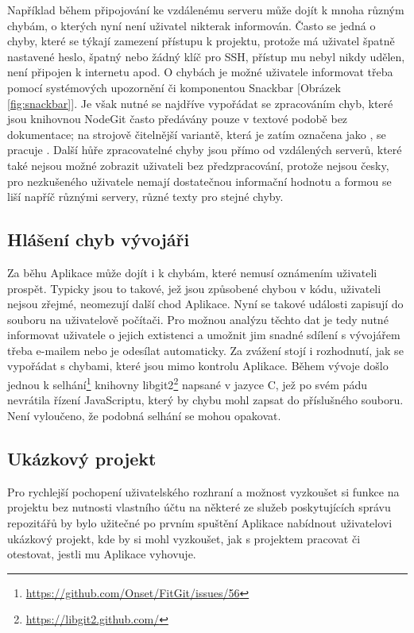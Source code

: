 Například během připojování ke vzdálenému serveru může dojít k mnoha různým chybám, o kterých nyní není uživatel nikterak informován. Často se jedná o chyby, které se týkají zamezení přístupu k projektu, protože má uživatel špatně nastavené heslo, špatný nebo žádný klíč pro SSH, přístup mu nebyl nikdy udělen, není připojen k internetu apod. O chybách je možné uživatele informovat třeba pomocí systémových upozornění či komponentou Snackbar [Obrázek \ref{fig:snackbar}]. Je však nutné se najdříve vypořádat se zpracováním chyb, které jsou knihovnou NodeGit často předávány pouze v textové podobě bez dokumentace; na strojově čitelnější variantě, která je zatím označena jako , se pracuje \cite{nodegit-error-codes}. Další hůře zpracovatelné chyby jsou přímo od vzdálených serverů, které také nejsou možné zobrazit uživateli bez předzpracování, protože nejsou česky, pro nezkušeného uživatele nemají dostatečnou informační hodnotu a formou se liší napříč různými servery, různé texty pro stejné chyby.

\subsection{Hlášení chyb vývojáři}

Za běhu Aplikace může dojít i k chybám, které nemusí oznámením uživateli prospět. Typicky jsou to takové, jež jsou způsobené chybou v kódu, uživateli nejsou zřejmé, neomezují další chod Aplikace. Nyní se takové události zapisují do souboru na uživatelově počítači. Pro možnou analýzu těchto dat je tedy nutné informovat uživatele o jejich extistenci a umožnit jim snadné sdílení s vývojářem třeba e-mailem nebo je odesílat automaticky. Za zvážení stojí i rozhodnutí, jak se vypořádat s chybami, které jsou mimo kontrolu Aplikace. Během vývoje došlo jednou k selhání\footnote{\url{https://github.com/Onset/FitGit/issues/56}} knihovny libgit2\footnote{\url{https://libgit2.github.com/}} napsané v jazyce C, jež po svém pádu nevrátila řízení JavaScriptu, který by chybu mohl zapsat do příslušného souboru. Není vyloučeno, že podobná selhání se mohou opakovat.

\subsection{Ukázkový projekt}

Pro rychlejší pochopení uživatelského rozhraní a možnost vyzkoušet si funkce na projektu bez nutnosti vlastního účtu na některé ze služeb poskytujících správu repozitářů by bylo užitečné po prvním spuštění Aplikace nabídnout uživatelovi ukázkový projekt, kde by si mohl vyzkoušet, jak s projektem pracovat či otestovat, jestli mu Aplikace vyhovuje.


